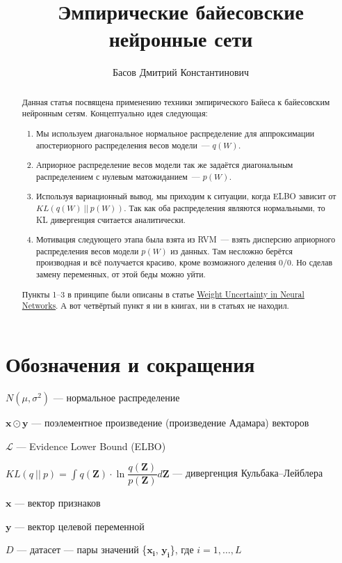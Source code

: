 \documentclass{article}
\title{Эмпирические байесовские нейронные сети}
\author{Басов Дмитрий Константинович}
\date{}
\begin{document}
\maketitle

\begin{abstract}
Данная статья посвящена применению техники эмпирического Байеса к байесовским нейронным сетям. Концептуально идея следующая:
\begin{enumerate}
 \item Мы используем диагональное нормальное распределение для аппроксимации апостериорного распределения весов модели~--- $q(W)$.
 \item Априорное распределение весов модели так же задаётся диагональным распределением с нулевым матожиданием~--- $p(W)$.
 \item Используя вариационный вывод, мы приходим к ситуации, когда ELBO зависит от $KL(q(W)~||~p(W))$. Так как оба распределения являются нормальными, то KL дивергенция считается аналитически.
 \item Мотивация следующего этапа была взята из RVM~--- взять дисперсию априорного распределения весов модели $p(W)$ из данных. Там несложно берётся производная и всё получается красиво, кроме возможного деления 0/0. Но сделав замену переменных, от этой беды можно уйти.
\end{enumerate}
Пункты 1--3 в принципе были описаны в статье \href{https://arxiv.org/pdf/1505.05424}{Weight Uncertainty in Neural Networks}. А вот четвёртый пункт я ни в книгах, ни в статьях не находил.
\end{abstract}


\section{Обозначения и сокращения}
$N(\mu, \sigma^2)$ --- нормальное распределение

$\pmb{x} \odot \pmb{y}$ --- поэлементное произведение (произведение Адамара) векторов

$\mathcal{L}$ --- Evidence Lower Bound (ELBO)

$KL(q~||~p) = \int_{}{} q(\pmb{Z}) \cdot \ln{\dfrac{q(\pmb{Z})}{p(\pmb{Z})}} d \pmb{Z}$ --- дивергенция Кульбака--Лейблера

$\pmb{x}$ --- вектор признаков

$\pmb{y}$ --- вектор целевой переменной

$D$ --- датасет --- пары значений \{$\pmb{x_i}$, $\pmb{y_i}$\}, где $i = 1, \dots, L$
\end{document}
